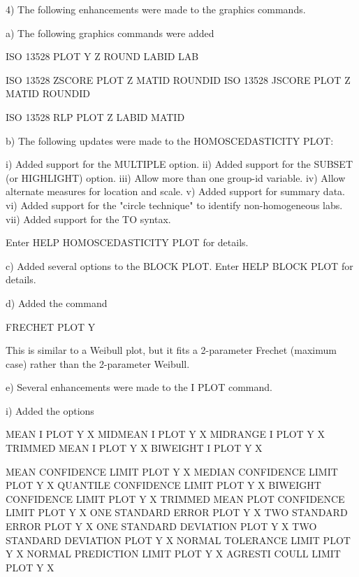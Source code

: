 { 4) The following enhancements were made to the graphics commands.

    a) The following graphics commands were added

           ISO 13528 PLOT Y Z ROUND LABID LAB

           ISO 13528 ZSCORE PLOT Z MATID ROUNDID
           ISO 13528 JSCORE PLOT Z MATID ROUNDID

           ISO 13528 RLP PLOT Z LABID MATID

    b) The following updates were made to the HOMOSCEDASTICITY PLOT:

          i) Added support for the MULTIPLE option.
         ii) Added support for the SUBSET (or HIGHLIGHT) option.
        iii) Allow more than one group-id variable.
         iv) Allow alternate measures for location and scale.
          v) Added support for summary data.
         vi) Added support for the "circle technique" to identify
             non-homogeneous labs.
        vii) Added support for the TO syntax.

       Enter HELP HOMOSCEDASTICITY PLOT for details.

    c) Added several options to the BLOCK PLOT.  Enter HELP BLOCK PLOT
       for details.

    d) Added the command 

          FRECHET PLOT Y

       This is similar to a Weibull plot, but it fits a 2-parameter
       Frechet (maximum case) rather than the 2-parameter Weibull.

    e) Several enhancements were made to the I PLOT command.

        i) Added the options

              MEAN I PLOT Y X
              MIDMEAN I PLOT Y X
              MIDRANGE I PLOT Y X
              TRIMMED MEAN I PLOT Y X
              BIWEIGHT I PLOT Y X

              MEAN CONFIDENCE LIMIT PLOT Y X
              MEDIAN CONFIDENCE LIMIT PLOT Y X
              QUANTILE CONFIDENCE LIMIT PLOT Y X
              BIWEIGHT CONFIDENCE LIMIT PLOT Y X
              TRIMMED MEAN PLOT CONFIDENCE LIMIT PLOT Y X
              ONE STANDARD ERROR PLOT Y X
              TWO STANDARD ERROR PLOT Y X
              ONE STANDARD DEVIATION PLOT Y X
              TWO STANDARD DEVIATION PLOT Y X
              NORMAL TOLERANCE LIMIT PLOT Y X
              NORMAL PREDICTION LIMIT PLOT Y X
              AGRESTI COULL LIMIT PLOT Y X

}
